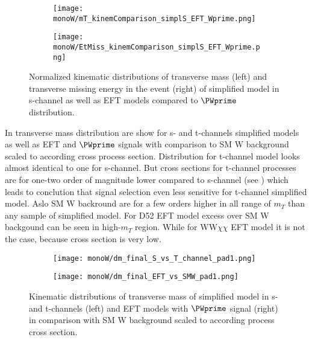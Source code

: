 \begin{figure}[hb]

\begin{subfigure}{.5\textwidth}
  \centering
  \texttt{[image: monoW/mT\_kinemComparison\_simplS\_EFT\_Wprime.png]}
\end{subfigure}%
\begin{subfigure}{.5\textwidth}
  \centering
  \texttt{[image: monoW/EtMiss\_kinemComparison\_simplS\_EFT\_Wprime.png]}
\end{subfigure}

\caption{Normalized kinematic distributions of transverse mass (left) and transverse missing energy in the event (right) of simplified model in s-channel as well as EFT models compared to $\PWprime$ distribution.}
  \label{fig:kinematicsSChannel}
\end{figure}

In  transverse mass distribution are show for s- and t-channels simplified models as well as EFT and $\PWprime$ signals with comparison to SM W background 
scaled to according cross process section. Distribution for t-channel model looks almost identical to one for s-channel. 
But cross sections for t-channel processes are for one-two order of magnitude lower compared to s-channel (see ) which leads to conclution
that signal selection even less sensitive for t-channel simplified model. Aslo SM W backround are for a few orders higher in all range of $m_{T}$ than any sample of simplified model.
For D52 EFT model excess over SM W backgound can be seen in high-$m_{T}$ region. While for WW$\chi\chi$ EFT model it is not the case, because cross section is very low.


\begin{figure}[hb]
\begin{subfigure}{.5\textwidth}
  \centering
  \texttt{[image: monoW/dm\_final\_S\_vs\_T\_channel\_pad1.png]} 
\end{subfigure}%
\begin{subfigure}{.5\textwidth}
  \centering
  \texttt{[image: monoW/dm\_final\_EFT\_vs\_SMW\_pad1.png]}
\end{subfigure}
\caption{Kinematic distributions of transverse mass of simplified model in s- and t-channels (left) 
and EFT models with $\PWprime$ signal (right) in comparison with SM W background scaled to according process cross section.}
  \label{fig:scaledKin}
\end{figure}

